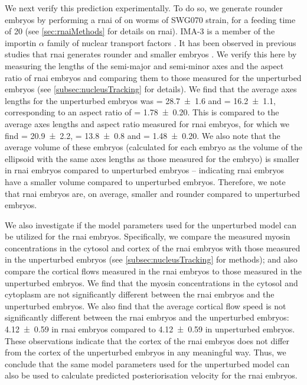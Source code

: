 We next verify this prediction experimentally. To do so, we generate rounder embryos by performing a \ac{rnai} of  on worms of SWG070 strain, for a feeding time of \SI{20}{\unitRNAiTime} (see \autoref{sec:rnaiMethods} for details on \ac{rnai}). IMA-3 is a member of the importin $\alpha$ family of nuclear transport factors \citep{geles2001germline,sonnichsen2005full}. It has been observed in previous studies that  \ac{rnai} generates rounder and smaller embryos \citep{sonnichsen2005full}. We verify this here by measuring the lengths of the semi-major \longAxisLength and semi-minor \shortAxisLength axes and the aspect ratio of  \ac{rnai} embryos and comparing them to those measured for the unperturbed embryos (see \autoref{subsec:nucleusTracking} for details). We find that the average axes lengths for the unperturbed embryos was \longAxisLength = \SI{28.7 +- 1.6}{\unitLength} and \shortAxisLength = \SI{16.2 +- 1.1}{\unitLength}, corresponding to an aspect ratio of \aspectRatio = \num{1.78 +- 0.20}. This is compared to the average axes lengths and aspect ratio measured for  \ac{rnai} embryos, for which we find \longAxisLength = \SI{20.9 +- 2.2}{\unitLength}, \shortAxisLength = \SI{13.8 +- 0.8}{\unitLength} and \aspectRatio = \num{1.48 +- 0.20}. We also note that the average volume of these embryos (calculated for each embryo as the volume of the ellipsoid with the same axes lengths as those measured for the embryo) is smaller in  \ac{rnai} embryos compared to unperturbed embryos -- indicating  \ac{rnai} embryos have a smaller volume compared to unperturbed embryos. Therefore, we note that  \ac{rnai} embryos are, on average, smaller and rounder compared to unperturbed embryos.

We also investigate if the model parameters used for the unperturbed model can be utilized for the \ac{rnai} embryos. Specifically, we compare the measured myosin concentrations in the cytosol and cortex of the \ac{rnai} embryos with those measured in the unperturbed embryos (see \autoref{subsec:nucleusTracking} for methods); and also compare the cortical flows measured in the \ac{rnai} embryos to those measured in the unperturbed embryos. We find that the myosin concentrations in the cytosol and cytoplasm are not significantly different between the \ac{rnai} embryos and the unperturbed embryos. We also find that the average cortical flow speed is not significantly different between the \ac{rnai} embryos and the unperturbed embryos: \SI{4.12 +- 0.59}{\unitCrtxVel} in \ac{rnai} embryos compared to \SI{4.12 +- 0.59}{\unitCrtxVel} in unperturbed embryos. These observations indicate that the cortex of the \ac{rnai} embryos does not differ from the cortex of the unperturbed embryos in any meaningful way. Thus, we conclude that the same model parameters used for the unperturbed model can also be used to calculate predicted posteriorisation velocity for the  \ac{rnai} embryos.

